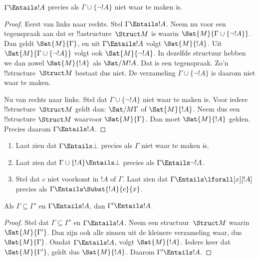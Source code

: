 \documentclass[../../../include/open-logic-section]{subfiles}
\begin{document}
\begin{prop}
$\Gamma \Entails !A$ precies als
$\Gamma \cup \{\lnot !A\}$ niet waar te maken is.
\end{prop}

\begin{proof}
Eerst van links naar rechts. Stel $\Gamma \Entails !A$. Neem nu voor
een tegenspraak aan dat er !!a{structure}~$\Struct M$ is waarin
$\Sat{M}{\Gamma \cup \{ \lnot !A \}}$. Dan geldt
$\Sat{M}{\Gamma}$, en uit $\Gamma \Entails !A$ volgt
$\Sat{M}{!A}$. Uit $\Sat{M}{\Gamma\cup \{ \lnot !A \}}$ volgt ook
$\Sat{M}{\lnot !A}$. In dezelfde structuur hebben we dan zowel
$\Sat{M}{!A}$ als $\Sat/{M}{!A}$. Dat is een tegenspraak. Zo'n
!!{structure}~$\Struct M$ bestaat dus niet. De verzameling
$\Gamma \cup \{ \lnot !A \}$ is daarom niet waar te maken.

Nu van rechts naar links. Stel dat
$\Gamma \cup \{ \lnot !A \}$ niet waar te maken is. Voor iedere
!!{structure}~$\Struct M$ geldt dan: $\Sat/{M}{\Gamma}$ of
$\Sat{M}{!A}$. Neem dus een !!{structure} $\Struct M$ waarvoor
$\Sat{M}{\Gamma}$. Dan moet $\Sat{M}{!A}$ gelden. Precies daarom
$\Gamma \Entails !A$.
\end{proof}

\begin{prob}
\begin{enumerate}
\item Laat zien dat $\Gamma \Entails \bot$ precies als $\Gamma$ niet
  waar te maken is.
\item Laat zien dat $\Gamma \cup \{!A\} \Entails \bot$ precies als
  $\Gamma \Entails \lnot !A$.
\item Stel dat $c$ niet voorkomt in $!A$ of $\Gamma$. Laat zien dat
  $\Gamma \Entails \lforall[x][!A]$ precies als $\Gamma \Entails
  \Subst{!A}{c}{x}$.
\end{enumerate}
\end{prob}

\begin{prop}
Als $\Gamma \subseteq \Gamma'$ en $\Gamma \Entails !A$, dan
$\Gamma' \Entails !A$.
\end{prop}

\begin{proof}
Stel dat $\Gamma \subseteq \Gamma'$ en $\Gamma \Entails !A$. Neem een
structuur~$\Struct M$ waarin $\Sat{M}{\Gamma'}$. Dan zijn ook alle
zinnen uit de kleinere verzameling waar, dus $\Sat{M}{\Gamma}$. Omdat
$\Gamma \Entails !A$, volgt $\Sat{M}{!A}$. Iedere keer dat
$\Sat{M}{\Gamma'}$, geldt dus $\Sat{M}{!A}$. Daarom
$\Gamma' \Entails !A$.
\end{proof}
\end{document}
